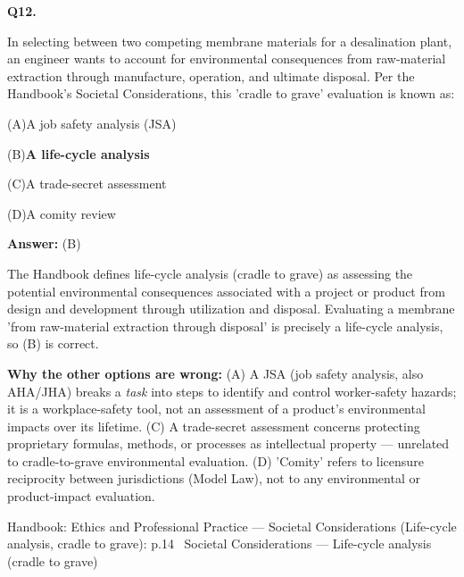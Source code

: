 \documentclass[11pt]{article}
\newcommand{\correct}[1]{\textbf{#1}\;{\color{accent}$\checkmark$}}
\newcommand{\optline}[2]{\par\noindent\hspace{1.2em}(#1)\hspace{0.6em}#2}
\begin{document}
\vspace{9pt}
\filbreak
\textbf{\color{accent}Q12.}\par\vspace{2pt}
In selecting between two competing membrane materials for a desalination plant, an engineer wants to account for environmental consequences from raw-material extraction through manufacture, operation, and ultimate disposal. Per the Handbook's Societal Considerations, this 'cradle to grave' evaluation is known as:\par\par\vspace{3pt}
\optline{A}{A job safety analysis (JSA)}
\optline{B}{\correct{A life-cycle analysis}}
\optline{C}{A trade-secret assessment}
\optline{D}{A comity review}
\par\vspace{3pt}
\vspace{2pt}\par\noindent\colorbox{boxbg}{\parbox{\dimexpr\linewidth-2\fboxsep\relax}{%
\vspace{2pt}\textbf{Answer:} (B)\par\vspace{2pt}
{\small The Handbook defines life-cycle analysis (cradle to grave) as assessing the potential environmental consequences associated with a project or product from design and development through utilization and disposal. Evaluating a membrane 'from raw-material extraction through disposal' is precisely a life-cycle analysis, so (B) is correct.\par
\textbf{Why the other options are wrong:} (A) A JSA (job safety analysis, also AHA/JHA) breaks a \emph{task} into steps to identify and control worker-safety hazards; it is a workplace-safety tool, not an assessment of a product's environmental impacts over its lifetime. (C) A trade-secret assessment concerns protecting proprietary formulas, methods, or processes as intellectual property --- unrelated to cradle-to-grave environmental evaluation. (D) 'Comity' refers to licensure reciprocity between jurisdictions (Model Law), not to any environmental or product-impact evaluation.\par}\par\vspace{2pt}
{\footnotesize\color{soft}Handbook: Ethics and Professional Practice --- Societal Considerations (Life-cycle analysis, cradle to grave): p.14 \textbullet\ Societal Considerations --- Life-cycle analysis (cradle to grave)}\vspace{2pt}
}}
\end{document}
